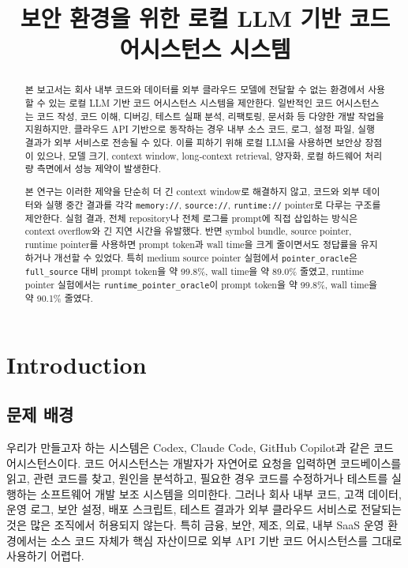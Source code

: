 \documentclass[11pt,a4paper]{article}
\title{보안 환경을 위한 로컬 LLM 기반 코드 어시스턴스 시스템}
\author{}
\date{}
\begin{document}
\maketitle

\begin{abstract}
본 보고서는 회사 내부 코드와 데이터를 외부 클라우드 모델에 전달할 수 없는 환경에서 사용할 수 있는 로컬 LLM 기반 코드 어시스턴스 시스템을 제안한다. 일반적인 코드 어시스턴스는 코드 작성, 코드 이해, 디버깅, 테스트 실패 분석, 리팩토링, 문서화 등 다양한 개발 작업을 지원하지만, 클라우드 API 기반으로 동작하는 경우 내부 소스 코드, 로그, 설정 파일, 실행 결과가 외부 서비스로 전송될 수 있다. 이를 피하기 위해 로컬 LLM을 사용하면 보안상 장점이 있으나, 모델 크기, context window, long-context retrieval, 양자화, 로컬 하드웨어 처리량 측면에서 성능 제약이 발생한다.

본 연구는 이러한 제약을 단순히 더 긴 context window로 해결하지 않고, 코드와 외부 데이터와 실행 중간 결과를 각각 \texttt{memory://}, \texttt{source://}, \texttt{runtime://} pointer로 다루는 구조를 제안한다. 실험 결과, 전체 repository나 전체 로그를 prompt에 직접 삽입하는 방식은 context overflow와 긴 지연 시간을 유발했다. 반면 symbol bundle, source pointer, runtime pointer를 사용하면 prompt token과 wall time을 크게 줄이면서도 정답률을 유지하거나 개선할 수 있었다. 특히 medium source pointer 실험에서 \texttt{pointer\_oracle}은 \texttt{full\_source} 대비 prompt token을 약 99.8\%, wall time을 약 89.0\% 줄였고, runtime pointer 실험에서는 \texttt{runtime\_pointer\_oracle}이 prompt token을 약 99.8\%, wall time을 약 90.1\% 줄였다.
\end{abstract}

\tableofcontents

\section{Introduction}

\subsection{문제 배경}

우리가 만들고자 하는 시스템은 Codex, Claude Code, GitHub Copilot과 같은 코드 어시스턴스이다. 코드 어시스턴스는 개발자가 자연어로 요청을 입력하면 코드베이스를 읽고, 관련 코드를 찾고, 원인을 분석하고, 필요한 경우 코드를 수정하거나 테스트를 실행하는 소프트웨어 개발 보조 시스템을 의미한다. 그러나 회사 내부 코드, 고객 데이터, 운영 로그, 보안 설정, 배포 스크립트, 테스트 결과가 외부 클라우드 서비스로 전달되는 것은 많은 조직에서 허용되지 않는다. 특히 금융, 보안, 제조, 의료, 내부 SaaS 운영 환경에서는 소스 코드 자체가 핵심 자산이므로 외부 API 기반 코드 어시스턴스를 그대로 사용하기 어렵다.
\end{document}
